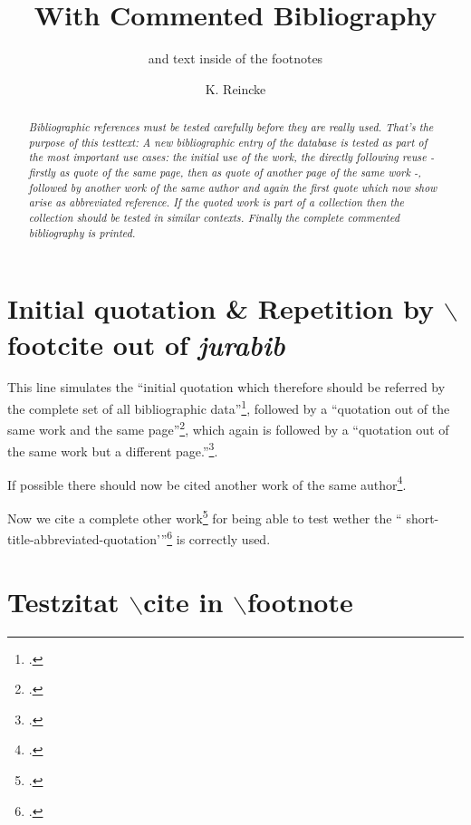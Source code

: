\documentclass[DIV=calc,BCOR=5mm,11pt,headings=small,oneside,abstract=true, toc=bib]{scrartcl}
\begin{document}
\nocite{*}

\titlehead{bibliography test}
\subject{For testing \itshape{new bibliographisc data}}
\title{With Commented Bibliography}
\subtitle{and text inside of the footnotes}
\author{K. Reincke}
\maketitle

\begin{abstract}
\noindent \itshape
Bibliographic references must be tested carefully before they are really used.
That's the purpose of this testtext: A new bibliographic entry of the database
is tested as part of the most important use cases: the initial use of the work,
the directly following reuse - firstly as quote of the same page, then as quote
of another page of the same work -, followed by another work of the same author
and again the first quote which now show arise as abbreviated reference. If the
quoted work is part of a collection then the collection should be tested in
similar contexts. Finally the complete commented bibliography is printed.
\end{abstract}

\section{Initial quotation \& Repetition by $\backslash$footcite out of
\emph{jurabib}}

This line simulates the \enquote{initial quotation which therefore should be
referred by the complete set of all bibliographic data}\footcite[cf.
besides:][S.123ff]{Maass2008a}, followed by a \enquote{quotation out of the same
work and the same page}\footcite[cf.][S.123ff]{Maass2008a}, which again is
followed by a \enquote{quotation out of the same work but a different
page.}\footcite[cf.][S.125f]{Maass2008a}.

If possible there should now be cited another work of the same
author\footcite[cf.][S.321]{Maass2008a}.

Now we cite a complete other work\footcite[cf.
additionally][S.42]{Spielkamp2008a} for being able to test wether the \enquote{
short-title-abbreviated-quotation'}\footcite[cf.
furthermode][S.123]{Maass2008a} is correctly used.

\section{Testzitat $\backslash$cite in $\backslash$footnote}
\end{document}
